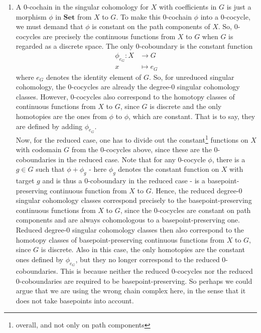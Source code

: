 \begin{enumerate}
\item[$\bullet$]
A $0$-cochain in the singular cohomology for $X$ with coefficients in $G$ is just a morphism $\phi$ in $\mathbf{Set}$ from $X$ to $G$.
To make this $0$-cochain $\phi$ into a $0$-cocycle, we must demand that $\phi$ is constant on the path components of $X$.
So, $0$-cocycles are precisely the continuous functions from $X$ to $G$ when $G$ is regarded as a discrete space.
The only $0$-coboundary is the constant function
\begin{align*}
  \phi_{e_{G}}
  \colon
  X
  &\rightarrow
  G
  \\
  x
  &\mapsto
  e_{G}
\end{align*}
where $e_{G}$ denotes the identity element of $G$.
So, for unreduced singular cohomology, the $0$-cocycles are already the degree-$0$ singular cohomology classes.
However, $0$-cocycles also correspond to the homotopy classes of continuous functions from $X$ to $G$, since $G$ is discrete and the only homotopies are the ones from $\phi$ to $\phi$, which are constant.
That is to say, they are defined by adding $\phi_{e_{G}}$.
\\
Now, for the reduced case, one has to divide out the constant\footnote{overall, and not only on path components} functions on $X$ with codomain $G$ from the $0$-cocycles above, since these are the $0$-coboundaries in the reduced case.
Note that for any $0$-cocycle $\phi$, there is a $g \in G$ such that $\phi + \phi_{g}$ - here $\phi_{g}$ denotes the constant function on $X$ with target $g$ and is thus a $0$-coboundary in the reduced case - is a basepoint-preserving continuous function from $X$ to $G$.
Hence, the reduced degree-$0$ singular cohomology classes correspond precisely to the basepoint-preserving continuous functions from $X$ to $G$, since the $0$-cocycles are constant on path components and are always cohomologous to a basepoint-preserving one.
Reduced degree-$0$ singular cohomology classes then also correspond to the homotopy classes of basepoint-preserving continuous functions from $X$ to $G$, since $G$ is discrete.
Also in this case, the only homotopies are the constant ones defined by $\phi_{e_{G}}$, but they no longer correspond to the reduced $0$-coboundaries.
This is because neither the reduced $0$-cocycles nor the reduced $0$-coboundaries are required to be basepoint-preserving.
So perhaps we could argue that we are using the wrong chain complex here, in the sense that it does not take basepoints into account.
\end{enumerate}
